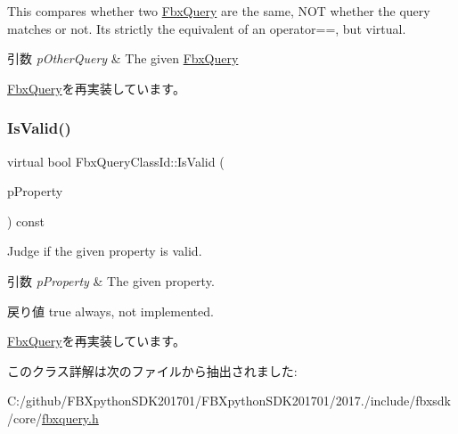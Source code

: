 This compares whether two \hyperlink{class_fbx_query}{Fbx\+Query} are the same, N\+OT whether the query matches or not. It\textquotesingle{}s strictly the equivalent of an operator==, but virtual. 
\begin{DoxyParams}{引数}
{\em p\+Other\+Query} & The given \hyperlink{class_fbx_query}{Fbx\+Query} \\
\hline
\end{DoxyParams}


\hyperlink{class_fbx_query_adfc24c7306ceed2fcfd8c67198e0c1dd}{Fbx\+Query}を再実装しています。

\mbox{\label{class_fbx_query_class_id_aaa9990771cab43ddc199eaeac2b6d754}} 
\subsubsection{\texorpdfstring{Is\+Valid()}{IsValid()}}
{\footnotesize\ttfamily virtual bool Fbx\+Query\+Class\+Id\+::\+Is\+Valid (\begin{DoxyParamCaption}\item[{const \hyperlink{class_fbx_property}{Fbx\+Property} \&}]{p\+Property }\end{DoxyParamCaption}) const\hspace{0.3cm}{\ttfamily [virtual]}}

Judge if the given property is valid. 
\begin{DoxyParams}{引数}
{\em p\+Property} & The given property. \\
\hline
\end{DoxyParams}
\begin{DoxyReturn}{戻り値}
{\ttfamily true} always, not implemented. 
\end{DoxyReturn}


\hyperlink{class_fbx_query_a822776baf45a56d8e126e948ec25d920}{Fbx\+Query}を再実装しています。



このクラス詳解は次のファイルから抽出されました\+:\begin{DoxyCompactItemize}
\item 
C\+:/github/\+F\+B\+Xpython\+S\+D\+K201701/\+F\+B\+Xpython\+S\+D\+K201701/2017./include/fbxsdk/core/\hyperlink{fbxquery_8h}{fbxquery.\+h}\end{DoxyCompactItemize}
